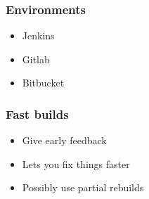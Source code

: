 \subsubsection{Environments}\label{ssub:environments}

\begin{itemize}
	\item Jenkins
	\item Gitlab
	\item Bitbucket
\end{itemize}

\subsubsection{Fast builds}\label{ssub:fast_builds}

\begin{itemize}
	\item Give early feedback
	\item Lets you fix things faster
	\item Possibly use partial rebuilds
\end{itemize}
